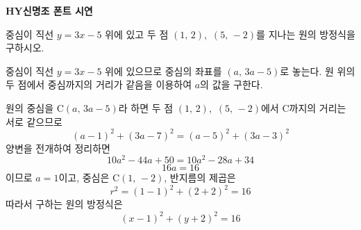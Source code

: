 \documentclass[10pt]{article}
\begin{document}
\begin{center}\bfseries\fontsize{14}{16}\selectfont [샘플] HY신명조 폰트 시연\end{center}
\vspace{5mm}


\begin{dmproblem}
중심이 직선 $y = 3x - 5$ 위에 있고 두 점 $(1,\, 2)$,\ $(5,\, -2)$를 지나는 원의 방정식을 구하시오.
\end{dmproblem}

\begin{dmapproach}
중심이 직선 $y = 3x - 5$ 위에 있으므로 중심의 좌표를 $(a,\, 3a - 5)$로 놓는다. 원 위의 두 점에서 중심까지의 거리가 같음을 이용하여 $a$의 값을 구한다.
\end{dmapproach}

\begin{dmsolution}
원의 중심을 $\mathrm{C}(a,\, 3a - 5)$라 하면 두 점 $(1,\, 2)$,\ $(5,\, -2)$에서 $\mathrm{C}$까지의 거리는 서로 같으므로
\begin{equation*}
  (a - 1)^2 + (3a - 7)^2 = (a - 5)^2 + (3a - 3)^2
\end{equation*}
양변을 전개하여 정리하면
\begin{equation*}
  10a^2 - 44a + 50 = 10a^2 - 28a + 34
\end{equation*}
\begin{equation*}
  16a = 16
\end{equation*}
이므로 $a = 1$이고, 중심은 $\mathrm{C}(1,\, -2)$, 반지름의 제곱은
\begin{equation*}
  r^2 = (1 - 1)^2 + (2 + 2)^2 = 16
\end{equation*}
따라서 구하는 원의 방정식은
\begin{equation*}
  (x - 1)^2 + (y + 2)^2 = 16
\end{equation*}
\end{dmsolution}
\end{document}
